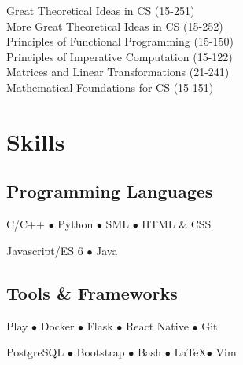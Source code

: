 \documentclass[]{openfont}
\begin{document}
\begin{minipage}[t]{0.40\textwidth}
Great Theoretical Ideas in CS (15-251) \\
More Great Theoretical Ideas in CS (15-252) \\
Principles of Functional Programming (15-150) \\

Principles of Imperative Computation (15-122) \\
Matrices and Linear Transformations (21-241) \\
Mathematical Foundations for CS (15-151)
\sectionsep


\section{Skills}
\subsection{Programming Languages}
\vspace{\topsep}
C/C++ \(\bullet\)
Python \(\bullet\)
SML \(\bullet\)
HTML \& CSS

Javascript/ES 6 \(\bullet\)
Java

\sectionsep

\subsection{Tools \& Frameworks}
\vspace{\topsep}
Play \(\bullet\)
Docker \(\bullet\)
Flask \(\bullet\)
React Native \(\bullet\)
Git

PostgreSQL \(\bullet\)
Bootstrap \(\bullet\)
Bash \(\bullet\)
\LaTeX \(\bullet\)
Vim
\sectionsep

%
%

\end{minipage} 
\hfill
\end{document}
